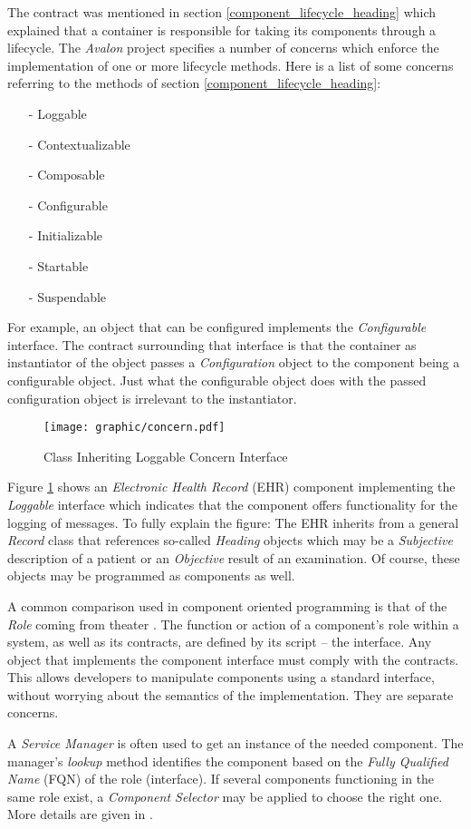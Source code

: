 The contract was mentioned in section \ref{component_lifecycle_heading} which
explained that a container is responsible for taking its components through a
lifecycle. The \emph{Avalon} project \cite{avalon} specifies a number of
concerns which enforce the implementation of one or more lifecycle methods.
Here is a list of some concerns referring to the methods of section
\ref{component_lifecycle_heading}:

\begin{itemize}
    \item[-] Loggable
    \item[-] Contextualizable
    \item[-] Composable
    \item[-] Configurable
    \item[-] Initializable
    \item[-] Startable
    \item[-] Suspendable
\end{itemize}

For example, an object that can be configured implements the \emph{Configurable}
interface. The contract surrounding that interface is that the container as
instantiator of the object passes a \emph{Configuration} object to the component
being a configurable object. Just what the configurable object does with the
passed configuration object is irrelevant to the instantiator.

\begin{figure}[ht]
    \begin{center}
        \texttt{[image: graphic/concern.pdf]}
        \caption{Class Inheriting Loggable Concern Interface}
        \label{concern_figure}
    \end{center}
\end{figure}

Figure \ref{concern_figure} shows an \emph{Electronic Health Record} (EHR)
component implementing the \emph{Loggable} interface which indicates that the
component offers functionality for the logging of messages. To fully explain
the figure: The EHR inherits from a general \emph{Record} class that references
so-called \emph{Heading} objects which may be a \emph{Subjective} description
of a patient or an \emph{Objective} result of an examination. Of course, these
objects may be programmed as components as well.

A common comparison used in component oriented programming is that of the
\emph{Role} coming from theater \cite{avalon}. The function or action of a
component's role within a system, as well as its contracts, are defined by its
script -- the interface. Any object that implements the component interface
must comply with the contracts. This allows developers to manipulate components
using a standard interface, without worrying about the semantics of the
implementation. They are separate concerns.

A \emph{Service Manager} is often used to get an instance of the needed
component. The manager's \emph{lookup} method identifies the component based on
the \emph{Fully Qualified Name} (FQN) of the role (interface). If several
components functioning in the same role exist, a \emph{Component Selector} may
be applied to choose the right one. More details are given in \cite{avalon}.
